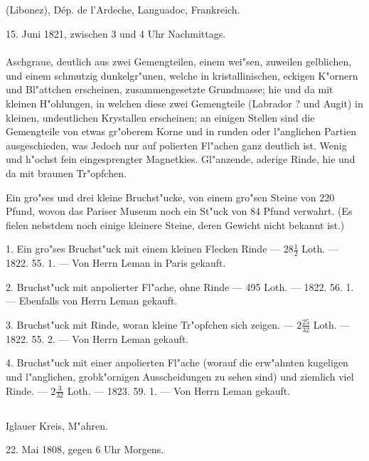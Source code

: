 \documentclass[a4paper, 11pt, oneside, polutonikogreek, german]{article}
\begin{document}
\subsection{}
\begin{center}
(Libonez), Dép. de l'Ardeche, Languadoc, Frankreich.

15. Juni 1821, zwischen 3 und 4 Uhr Nachmittags.
\end{center}
\paragraph{}
Aschgraue, deutlich aus zwei Gemengteilen, einem wei"sen, zuweilen gelblichen, und einem schmutzig dunkelgr"unen, welche in kristallinischen, eckigen K"ornern und Bl"attchen erscheinen, zusammengesetzte Grundmasse; hie und da mit kleinen H"ohlungen, in welchen diese zwei Gemengteile (Labrador ? und Augit) in kleinen, undeutlichen Krystallen erscheinen; an einigen Stellen sind die Gemengteile von etwas gr"oberem Korne und in runden oder l"anglichen Partien ausgeschieden, was Jedoch nur auf polierten Fl"achen ganz deutlich ist. Wenig und h"ochst fein eingesprengter Magnetkies. Gl"anzende, aderige Rinde, hie und da mit braunen Tr"opfchen.

Ein gro"ses und drei kleine Bruchst"ucke, von einem gro"sen Steine von 220 Pfund, wovon das Pariser Museum noch ein St"uck von 84 Pfund verwahrt. (Es fielen nebstdem noch einige kleinere Steine, deren Gewicht nicht bekannt ist.)

1. Ein gro"ses Bruchst"uck mit einem kleinen Flecken Rinde --- $\mathfrak{28\frac{1}{2}}$ Loth. --- 1822. 55. 1. --- Von Herrn Leman in Paris gekauft.

2. Bruchst"uck mit anpolierter Fl"ache, ohne Rinde --- 495 Loth. --- 1822. 56. 1. --- Ebenfalls von Herrn Leman gekauft.

3. Bruchst"uck mit Rinde, woran kleine Tr"opfchen sich zeigen. --- $\mathfrak{2\frac{25}{32}}$ Loth. --- 1822. 55. 2. --- Von Herrn Leman gekauft.

4. Bruchst"uck mit einer anpolierten Fl"ache (worauf die erw"ahnten kugeligen und l"anglichen, grobk"ornigen Ausscheidungen zu sehen sind) und ziemlich viel Rinde. --- $\mathfrak{2\frac{3}{32}}$ Loth. --- 1823. 59. 1. --- Von Herrn Leman gekauft.
\subsection{}
\begin{center}
Iglauer Kreis, M"ahren.

22. Mai 1808, gegen 6 Uhr Morgens.
\end{center}
\end{document}
